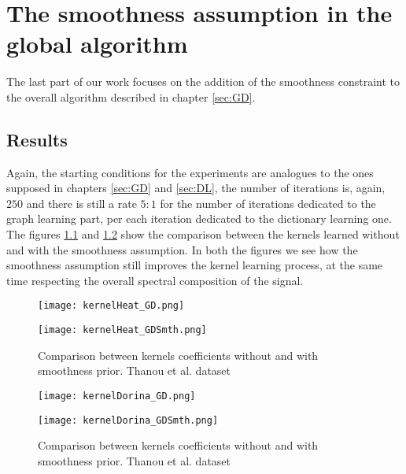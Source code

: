\chapter{The smoothness assumption in the global algorithm}
The last part of our work focuses on the addition of the smoothness constraint to the overall algorithm described in chapter \ref{sec:GD}.
\section{Results}
Again, the starting conditions for the experiments are analogues to the ones supposed in chapters \ref{sec:GD} and \ref{sec:DL}, the number of iterations is, again, $250$ and there is still a rate $5:1$ for the number of iterations dedicated to the graph learning part, per each iteration dedicated to the dictionary learning one.
\\

The figures \ref{fig:alphaHeatGD_smth} and \ref{fig:alphaDorinaGD_smth} show the comparison between the kernels learned without and with the smoothness assumption. In both the figures we see how the smoothness assumption still improves the kernel learning process, at the same time respecting the overall spectral composition of the signal.

\begin{figure}
  \centering
  \begin{minipage}[c]{.8\textwidth}
    \centering
    \texttt{[image: kernelHeat\_GD.png]}
  \end{minipage}
  \begin{minipage}[c]{.8\textwidth}
    \centering
    \texttt{[image: kernelHeat\_GDSmth.png]}
  \end{minipage}
  \caption{Comparison between kernels coefficients without and with smoothness prior. Thanou et al.   dataset}
  \label{fig:alphaHeatGD_smth}
\end{figure}

\begin{figure}
  \centering
  \begin{minipage}[c]{.8\textwidth}
    \centering
    \texttt{[image: kernelDorina\_GD.png]}
  \end{minipage}
  \begin{minipage}[c]{.8\textwidth}
    \centering
    \texttt{[image: kernelDorina\_GDSmth.png]}
  \end{minipage}
  \caption{Comparison between kernels coefficients without and with smoothness prior. Thanou et al.   dataset}
  \label{fig:alphaDorinaGD_smth}
\end{figure}

